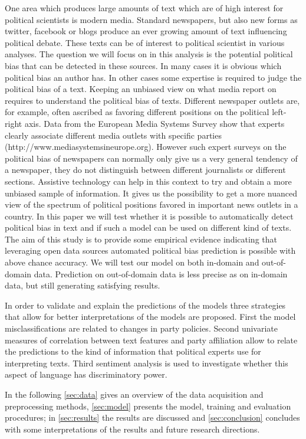 \documentclass{article}
\begin{document}
One area which produces large amounts of text which are of high interest for political scientists is modern media. Standard newspapers, but also new forms as twitter, facebook or blogs produce an ever growing amount of text influencing political debate. These texts can be of interest to political scientist in various analyses. The question we will focus on in this analysis is the potential political bias that can be detected in these sources. In many cases it is obvious which political bias an author has. In other cases some expertise is required to judge the political bias of a text. Keeping an unbiased view on what media report on requires to understand the political bias of texts. Different newspaper outlets are, for example, often ascribed as favoring different positions on the political left-right axis. Data from the European Media Systems Survey show that experts clearly associate different media outlets with specific parties (http://www.mediasystemsineurope.org). However such expert surveys on the political bias of newspapers can normally only give us a very general tendency of a newspaper, they do not distinguish between different journalists or different sections. Assistive technology can help in this context to try and obtain a more unbiased sample of information. It gives us the possibility to get a more nuanced view of the spectrum of political positions favored in important news outlets in a country. In this paper we will test whether it is possible to automatically detect political bias in text and if such a model can be used on different kind of texts. The aim of this study is to provide some empirical evidence indicating that leveraging open data sources automated political bias prediction is possible with above chance accuracy. We will test our model on both in-domain and out-of-domain data. Prediction on out-of-domain data is less precise as on in-domain data, but still generating satisfying results.

In order to validate and explain the predictions of the models three strategies that allow for better interpretations of the models are proposed. First the model misclassifications are related to changes in party policies. Second univariate measures of correlation between text features and party affiliation allow to relate the predictions to the kind of information that political experts use for interpreting texts. Third sentiment analysis is used to investigate whether this aspect of language has discriminatory power.

In the following \autoref{sec:data} gives an overview of the data acquisition and preprocessing methods, \autoref{sec:model} presents the model, training and evaluation procedures; in \autoref{sec:results} the results are discussed and \autoref{sec:conclusion} concludes with some interpretations of the results and future research directions.
\end{document}
